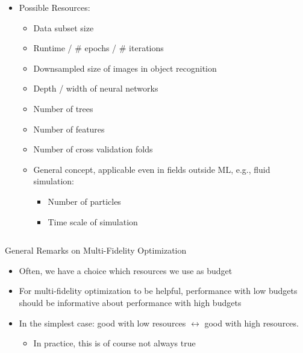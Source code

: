 {\begin{columns}
    \begin{column}{.9\linewidth}
    \vspace{-10em}
\pause
\medskip
    \begin{itemize}
    	\item Possible Resources:
    	\begin{itemize}
    	    \item Data subset size
    	    \item Runtime / \# epochs / \# iterations
\pause
\smallskip
    	    \item Downsampled size of images in object recognition
    	    \item Depth / width of neural networks
\pause
\smallskip
    	    \item Number of trees 
    	    \item Number of features
    	    \item Number of cross validation folds
\pause
\bigskip
    	    \item General concept, applicable even in fields outside ML, e.g., fluid simulation:
    	    \begin{itemize}
    	        \item Number of particles
    	        \item Time scale of simulation
    	    \end{itemize}
    	\end{itemize}
    \end{itemize}
\end{column}
\begin{column}{0\linewidth}
\end{column}
\end{columns}
}


\begin{frame}[c]{General Remarks on Multi-Fidelity Optimization}

\begin{itemize}
    \item Often, we have a \alert{choice} which resources we use as budget
\bigskip
\pause
    \item For multi-fidelity optimization to be helpful, \alert{performance with low budgets should be informative about performance with high budgets}  
\bigskip    
\pause  
    \item In the simplest case: 
    good with low resources $\leftrightarrow$ good with high resources.
    \begin{itemize}
        \item In practice, this is of course not always true
    \end{itemize}
    
\end{itemize}


\end{frame}



